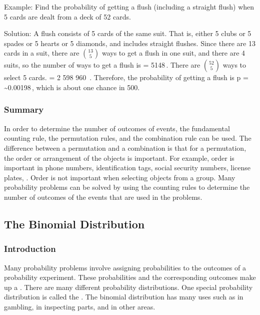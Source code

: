 Example: Find the probability of getting a flush (including a straight flush) when 5 cards are dealt from a deck of 52 cards.

Solution: A flush consists of 5 cards of the same suit. That is, either 5 clubs or 5 spades or 5 hearts or 5 diamonds, and includes straight flushes. Since there are 13 cards in a suit, there are $\binom{13}{5}$ ways to get a flush in one suit, and there are 4 suits, so the number of ways to get a flush is
 = 5148\,.
\eeq
There are $\binom{52}{5}$ ways to select 5 cards.
\beq
{} = 2 598 960 \,.
\eeq
Therefore, the probability of getting a flush is
\beq
p = \sim 0.00198\,,
\eeq
which is about one chance in 500.


\subsubsection{Summary}
In order to determine the number of outcomes of events, the fundamental counting rule, the permutation rules, and the combination rule can be used. The difference between a permutation and a combination is that for a permutation, the order or arrangement of the objects is important. For example, order is important in phone numbers, identification tags, social security numbers, license plates, \etc. Order is not important when selecting objects from a group. Many probability problems can be solved by using the counting rules to determine the number of outcomes of the events that are used in the problems.


\subsection{The Binomial Distribution}

\subsubsection{Introduction}
Many probability problems involve assigning probabilities to the outcomes of a probability experiment. These probabilities and the corresponding outcomes make up a . There are many different probability distributions. One special probability distribution is called the . The binomial distribution has many uses such as in gambling, in inspecting parts, and in other areas.


